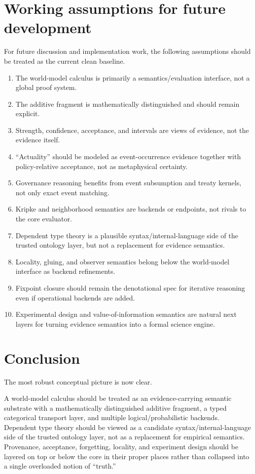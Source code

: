 \documentclass[11pt]{article}
\begin{document}
\section{Working assumptions for future development}

For future discussion and implementation work, the following assumptions should
be treated as the current clean baseline.

\begin{enumerate}
  \item The world-model calculus is primarily a semantics/evaluation interface,
        not a global proof system.
  \item The additive fragment is mathematically distinguished and should remain
        explicit.
  \item Strength, confidence, acceptance, and intervals are views of evidence,
        not the evidence itself.
  \item ``Actuality'' should be modeled as event-occurrence evidence together
        with policy-relative acceptance, not as metaphysical certainty.
  \item Governance reasoning benefits from event subsumption and treaty kernels,
        not only exact event matching.
  \item Kripke and neighborhood semantics are backends or endpoints, not rivals
        to the core evaluator.
  \item Dependent type theory is a plausible syntax/internal-language side of the
        trusted ontology layer, but not a replacement for evidence semantics.
  \item Locality, gluing, and observer semantics belong below the world-model
        interface as backend refinements.
  \item Fixpoint closure should remain the denotational spec for iterative
        reasoning even if operational backends are added.
  \item Experimental design and value-of-information semantics are natural next
        layers for turning evidence semantics into a formal science engine.
\end{enumerate}

\section{Conclusion}

The most robust conceptual picture is now clear.

A world-model calculus should be treated as an evidence-carrying semantic
substrate with a mathematically distinguished additive fragment, a typed
categorical transport layer, and multiple logical/probabilistic backends.
Dependent type theory should be viewed as a candidate syntax/internal-language
side of the trusted ontology layer, not as a replacement for empirical
semantics.  Provenance, acceptance, forgetting, locality, and experiment
design should be layered on top or below the core in their proper places rather
than collapsed into a single overloaded notion of ``truth.''
\end{document}
